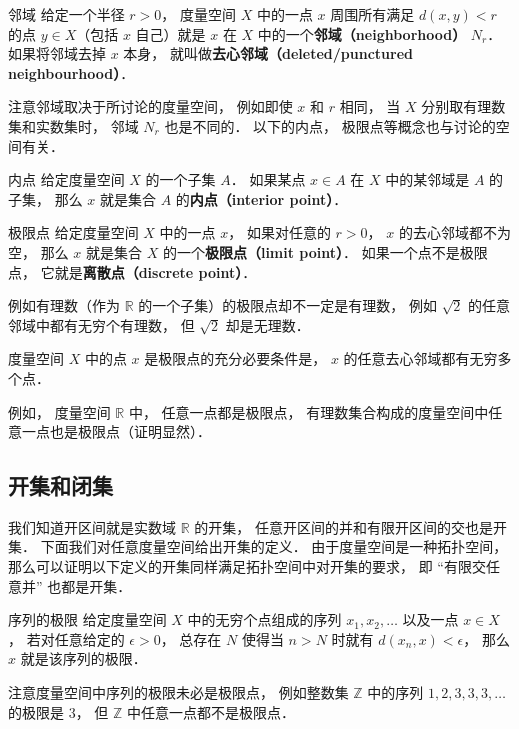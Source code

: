 \begin{definition}{邻域}
给定一个半径 $r > 0$， 度量空间 $X$ 中的一点 $x$ 周围所有满足 $d(x, y) < r$ 的点 $y \in X$（包括 $x$ 自己）就是 $x$ 在 $X$ 中的一个\textbf{邻域（neighborhood）} $N_r$． 如果将邻域去掉 $x$ 本身， 就叫做\textbf{去心邻域（deleted/punctured neighbourhood）}．
\end{definition}
注意邻域取决于所讨论的度量空间， 例如即使 $x$ 和 $r$ 相同， 当 $X$ 分别取有理数集和实数集时， 邻域 $N_r$ 也是不同的． 以下的内点， 极限点等概念也与讨论的空间有关．

\begin{definition}{内点}
给定度量空间 $X$ 的一个子集 $A$． 如果某点 $x\in A$ 在 $X$ 中的某邻域是 $A$ 的子集， 那么 $x$ 就是集合 $A$ 的\textbf{内点（interior point）}．
\end{definition}

\begin{definition}{极限点}
给定度量空间 $X$ 中的一点 $x$， 如果对任意的 $r > 0$， $x$ 的去心邻域都不为空， 那么 $x$ 就是集合 $X$ 的一个\textbf{极限点（limit point）}． 如果一个点不是极限点， 它就是\textbf{离散点（discrete point）}．
\end{definition}

例如有理数（作为 $\mathbb R$ 的一个子集）的极限点却不一定是有理数， 例如 $\sqrt{2}$ 的任意邻域中都有无穷个有理数， 但 $\sqrt{2}$ 却是无理数．

\begin{corollary}{}
度量空间 $X$ 中的点 $x$ 是极限点的充分必要条件是， $x$ 的任意去心邻域都有无穷多个点．
\end{corollary}

例如， 度量空间 $\mathbb R$ 中， 任意一点都是极限点， 有理数集合构成的度量空间中任意一点也是极限点（证明显然）．

\subsection{开集和闭集}
我们知道开区间就是实数域 $\mathbb R$ 的开集， 任意开区间的并和有限开区间的交也是开集． 下面我们对任意度量空间给出开集的定义． 由于度量空间是一种拓扑空间， 那么可以证明以下定义的开集同样满足拓扑空间中对开集的要求， 即 “有限交任意并” 也都是开集．







\begin{definition}{序列的极限}
给定度量空间 $X$ 中的无穷个点组成的序列 $x_1, x_2, \dots$ 以及一点 $x \in X$， 若对任意给定的 $\epsilon > 0$， 总存在 $N$ 使得当 $n > N$ 时就有 $d(x_n, x) < \epsilon$， 那么 $x$ 就是该序列的极限．
\end{definition}
注意度量空间中序列的极限未必是极限点， 例如整数集 $\mathbb Z$ 中的序列 $1, 2, 3, 3, 3, \dots$ 的极限是 $3$， 但 $\mathbb Z$ 中任意一点都不是极限点．

